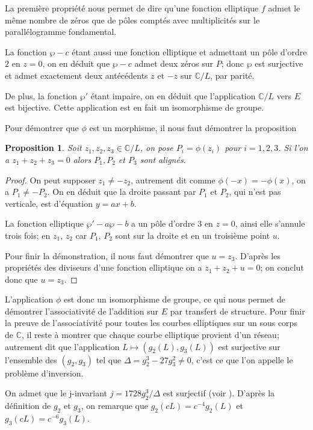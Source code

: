 \documentclass{article}
\newtheorem{proposition}{Proposition}
\begin{document}
La première propriété nous permet de dire qu'une fonction elliptique $f$ admet le même nombre de zéros que de 
pôles comptés avec multiplicités sur le parallélogramme fondamental.

La fonction $\wp - c$ étant aussi une fonction elliptique et admettant un pôle d'ordre $2$ en $z=0$, on en
déduit que $\wp - c$ admet deux zéros sur $P$; donc $\wp$ est surjective et admet exactement deux antécédents $z$ et 
$-z$ sur $\mathbb{C}/L$, par parité.

De plus, la fonction $\wp'$ étant impaire, on en déduit que l'application $\mathbb{C}/L$ vers $E$ est bijective.
Cette application est en fait un isomorphisme de groupe.

Pour démontrer que $\phi$ est un morphisme, il nous faut démontrer la proposition
\begin{proposition}
Soit $z_{1}, z_{2}, z_{3} \in \mathbb{C}/L$, on pose $P_{i} = \phi(z_{i})$ pour $i=1,2,3$.
Si l'on a $z_{1} + z_{2} + z_{3} = 0$ alors $P_{1}, P_{2}$ et $P_{3}$ sont alignés.
\end{proposition}

\begin{proof}
On peut supposer $z_{1} \neq -z_{2}$, autrement dit comme $\phi(-x) = -\phi(x)$, on a $P_{1} \neq -P_{2}$. On en déduit que la droite passant
par $P_{1}$ et $P_{2}$, qui n'est pas verticale, est d'équation $y = ax+b$.

La fonction elliptique
$\wp' - a\wp - b$ a un pôle d'ordre $3$ en $z=0$, ainsi elle s'annule trois fois; en $z_{1}$, $z_{2}$ car
$P_{1}$, $P_{2}$ sont sur la droite et en un troisième point $u$.

Pour finir la démonstration, il nous faut
démontrer que $u = z_{3}$. D'après les propriétés des diviseurs d'une fonction elliptique
on a $z_{1} + z_{2} + u = 0$; on conclut donc que $u = z_{3}$.
\end{proof}

L'application $\phi$ est donc un isomorphisme de groupe, ce qui nous permet de démontrer l'associativité
de l'addition sur $E$ par transfert de structure. Pour finir la preuve de l'associativité pour toutes
les courbes elliptiques sur un sous corps de $\mathbb{C}$, il reste à
montrer que chaque courbe elliptique provient d'un réseau; autrement dit que l'application 
$L \longmapsto (g_{2}(L), g_{3}(L))$ est surjective sur l'ensemble des $(g_{2}, g_{3})$ tel que 
$\Delta = g_{2}^3 - 27g_{3}^2 \neq 0$, c'est ce que l'on appelle le problème d'inversion.

On admet que le j-invariant $j = 1728g_{2}^3/\Delta$ est surjectif (voir \cite{serre_cours_1994}).
D'après la définition de $g_{2}$ et $g_{3}$, on remarque que $g_{2}(cL) = c^{-4}g_{2}(L)$ et $g_{3}(cL) = c^{-6}g_{3}(L)$.
\end{document}
